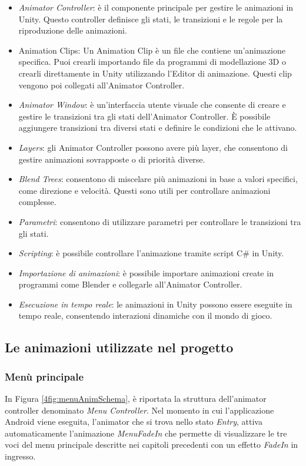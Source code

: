 \begin{itemize}
    \item \textit{Animator Controller}: è il componente principale per gestire le animazioni in Unity. Questo controller definisce gli stati, le transizioni e le regole per la riproduzione delle animazioni.
    \item Animation Clips: Un Animation Clip è un file che contiene un'animazione specifica. Puoi crearli importando file da programmi di modellazione 3D o crearli direttamente in Unity utilizzando l'Editor di animazione. Questi clip vengono poi collegati all'Animator Controller.
    \item \textit{Animator Window}: è un'interfaccia utente visuale che consente di creare e gestire le transizioni tra gli stati dell'Animator Controller. È possibile aggiungere transizioni tra diversi stati e definire le condizioni che le attivano.
    \item \textit{Layers}: gli Animator Controller possono avere più layer, che consentono di gestire animazioni sovrapposte o di priorità diverse.
    \item \textit{Blend Trees}: consentono di miscelare più animazioni in base a valori specifici, come direzione e velocità. Questi sono utili per controllare animazioni complesse.
    \item \textit{Parametri}: consentono di utilizzare parametri per controllare le transizioni tra gli stati.
    \item \textit{Scripting}: è possibile controllare l'animazione tramite script C\# in Unity.
    \item \textit{Importazione di animazioni}: è possibile importare animazioni create in programmi come Blender e collegarle all'Animator Controller.
    \item \textit{Esecuzione in tempo reale}: le animazioni in Unity possono essere eseguite in tempo reale, consentendo interazioni dinamiche con il mondo di gioco.
\end{itemize}

\subsection{Le animazioni utilizzate nel progetto}

\subsubsection{Menù principale}

In Figura \ref{4fig:menuAnimSchema}, è riportata la struttura dell'animator controller denominato \textit{Menu Controller}. Nel momento in cui l'applicazione Android viene eseguita, l'animator che si trova nello stato \textit{Entry}, attiva automaticamente l'animazione \textit{MenuFadeIn} che permette di visualizzare le tre voci del menu principale descritte nei capitoli precedenti con un effetto \textit{FadeIn} in ingresso.

